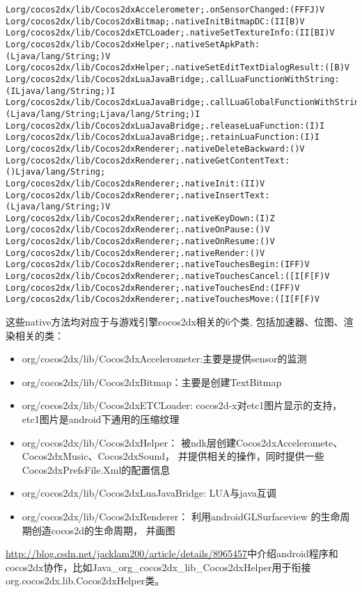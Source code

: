 \begin{lstlisting}
Lorg/cocos2dx/lib/Cocos2dxAccelerometer;.onSensorChanged:(FFFJ)V
Lorg/cocos2dx/lib/Cocos2dxBitmap;.nativeInitBitmapDC:(II[B)V
Lorg/cocos2dx/lib/Cocos2dxETCLoader;.nativeSetTextureInfo:(II[BI)V
Lorg/cocos2dx/lib/Cocos2dxHelper;.nativeSetApkPath:(Ljava/lang/String;)V
Lorg/cocos2dx/lib/Cocos2dxHelper;.nativeSetEditTextDialogResult:([B)V
Lorg/cocos2dx/lib/Cocos2dxLuaJavaBridge;.callLuaFunctionWithString:(ILjava/lang/String;)I
Lorg/cocos2dx/lib/Cocos2dxLuaJavaBridge;.callLuaGlobalFunctionWithString:(Ljava/lang/String;Ljava/lang/String;)I
Lorg/cocos2dx/lib/Cocos2dxLuaJavaBridge;.releaseLuaFunction:(I)I
Lorg/cocos2dx/lib/Cocos2dxLuaJavaBridge;.retainLuaFunction:(I)I
Lorg/cocos2dx/lib/Cocos2dxRenderer;.nativeDeleteBackward:()V
Lorg/cocos2dx/lib/Cocos2dxRenderer;.nativeGetContentText:()Ljava/lang/String;
Lorg/cocos2dx/lib/Cocos2dxRenderer;.nativeInit:(II)V
Lorg/cocos2dx/lib/Cocos2dxRenderer;.nativeInsertText:(Ljava/lang/String;)V
Lorg/cocos2dx/lib/Cocos2dxRenderer;.nativeKeyDown:(I)Z
Lorg/cocos2dx/lib/Cocos2dxRenderer;.nativeOnPause:()V
Lorg/cocos2dx/lib/Cocos2dxRenderer;.nativeOnResume:()V
Lorg/cocos2dx/lib/Cocos2dxRenderer;.nativeRender:()V
Lorg/cocos2dx/lib/Cocos2dxRenderer;.nativeTouchesBegin:(IFF)V
Lorg/cocos2dx/lib/Cocos2dxRenderer;.nativeTouchesCancel:([I[F[F)V
Lorg/cocos2dx/lib/Cocos2dxRenderer;.nativeTouchesEnd:(IFF)V
Lorg/cocos2dx/lib/Cocos2dxRenderer;.nativeTouchesMove:([I[F[F)V
\end{lstlisting}
这些native方法均对应于与游戏引擎cocos2dx相关的6个类,
包括加速器、位图、渲染相关的类：
\begin{itemize}
\item org/cocos2dx/lib/Cocos2dxAccelerometer:主要是提供sensor的监测
\item org/cocos2dx/lib/Cocos2dxBitmap：主要是创建TextBitmap
\item org/cocos2dx/lib/Cocos2dxETCLoader:
	cocos2d-x对etc1图片显示的支持，etc1图片是android下通用的压缩纹理
\item org/cocos2dx/lib/Cocos2dxHelper：
	被ndk层创建Cocos2dxAcceleromete、Cocos2dxMusic、Cocos2dxSound，
	并提供相关的操作，同时提供一些Cocos2dxPrefsFile.Xml的配置信息
\item org/cocos2dx/lib/Cocos2dxLuaJavaBridge: LUA与java互调
\item org/cocos2dx/lib/Cocos2dxRenderer：
	利用androidGLSurfaceview 的生命周期创造cocos2d的生命周期，
	并画图
\end{itemize}

\url{http://blog.csdn.net/jacklam200/article/details/8965457}中介绍android程序和cocos2dx协作，比如Java\_org\_cocos2dx\_lib\_Cocos2dxHelper用于衔接org.cocos2dx.lib.Cocos2dxHelper类。
 
